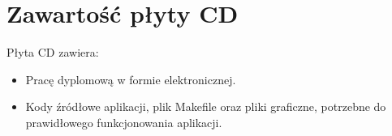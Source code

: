 \chapter{Zawartość płyty CD}
\thispagestyle{chapterBeginStyle}
\label{plytaCD}

Płyta CD zawiera:
\begin{itemize}
\item Pracę dyplomową w formie elektronicznej.
\item Kody źródłowe aplikacji, plik Makefile oraz pliki graficzne, potrzebne do prawidłowego funkcjonowania aplikacji.
\end{itemize}
